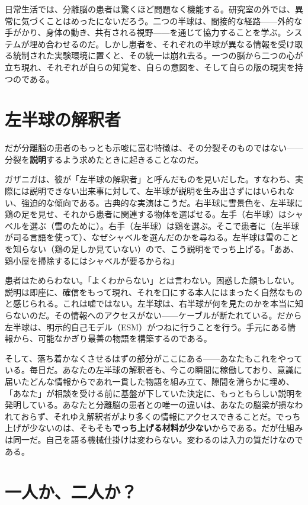 \documentclass[11pt, twoside, openright]{book}
\begin{document}
日常生活では、分離脳の患者は驚くほど問題なく機能する。研究室の外では、異常に気づくことはめったにないだろう。二つの半球は、間接的な経路------外的な手がかり、身体の動き、共有される視野------を通じて協力することを学ぶ。システムが埋め合わせるのだ。しかし患者を、それぞれの半球が異なる情報を受け取る統制された実験環境に置くと、その統一は崩れ去る。一つの脳から二つの心が立ち現れ、それぞれが自らの知覚を、自らの意図を、そして自らの版の現実を持つのである。

\section*{左半球の解釈者}

だが分離脳の患者のもっとも示唆に富む特徴は、その分裂そのものではない------分裂を\textbf{説明}するよう求めたときに起きることなのだ。

ガザニガは、彼が「左半球の解釈者」と呼んだものを見いだした。すなわち、実際には説明できない出来事に対して、左半球が説明を生み出さずにはいられない、強迫的な傾向である。古典的な実演はこうだ。右半球に雪景色を、左半球に鶏の足を見せ、それから患者に関連する物体を選ばせる。左手（右半球）はシャベルを選ぶ（雪のために）。右手（左半球）は鶏を選ぶ。そこで患者に（左半球が司る言語を使って）、なぜシャベルを選んだのかを尋ねる。左半球は雪のことを知らない（鶏の足しか見ていない）ので、こう説明をでっち上げる。「ああ、鶏小屋を掃除するにはシャベルが要るからね」

患者はためらわない。「よくわからない」とは言わない。困惑した顔もしない。説明は即座に、確信をもって現れ、それを口にする本人にはまったく自然なものと感じられる。これは嘘ではない。左半球は、右半球が何を見たのかを本当に知らないのだ。その情報へのアクセスがない------ケーブルが断たれている。だから左半球は、明示的自己モデル（ESM）がつねに行うことを行う。手元にある情報から、可能なかぎり最善の物語を構築するのである。

そして、落ち着かなくさせるはずの部分がここにある------あなたもこれをやっている。毎日だ。あなたの左半球の解釈者も、今この瞬間に稼働しており、意識に届いたどんな情報からであれ一貫した物語を組み立て、隙間を滑らかに埋め、「あなた」が相談を受ける前に基盤が下していた決定に、もっともらしい説明を発明している。あなたと分離脳の患者との唯一の違いは、あなたの脳梁が損なわれておらず、それゆえ解釈者がより多くの情報にアクセスできることだ。でっち上げが少ないのは、そもそも\textbf{でっち上げる材料が少ない}からである。だが仕組みは同一だ。自己を語る機械仕掛けは変わらない。変わるのは入力の質だけなのである。

\section*{一人か、二人か？}
\end{document}
